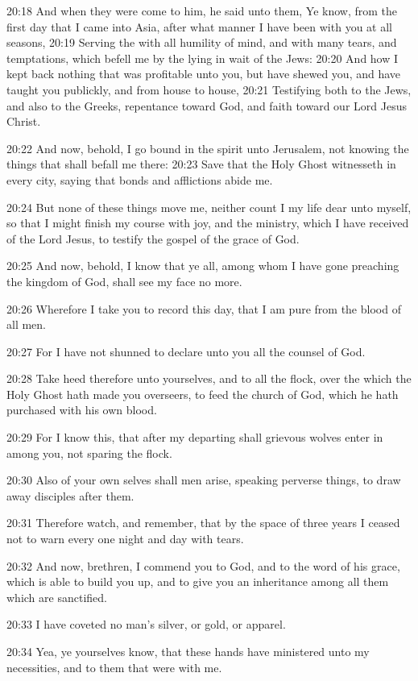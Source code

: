 20:18 And when they were come to him, he said unto them, Ye know, from the first day that I came into Asia, after what manner I have been with you at all seasons, 20:19 Serving the \LORD with all humility of mind, and with many tears, and temptations, which befell me by the lying in wait of the Jews: 20:20 And how I kept back nothing that was profitable unto you, but have shewed you, and have taught you publickly, and from house to house, 20:21 Testifying both to the Jews, and also to the Greeks, repentance toward God, and faith toward our Lord Jesus Christ.

20:22 And now, behold, I go bound in the spirit unto Jerusalem, not knowing the things that shall befall me there: 20:23 Save that the Holy Ghost witnesseth in every city, saying that bonds and afflictions abide me.

20:24 But none of these things move me, neither count I my life dear unto myself, so that I might finish my course with joy, and the ministry, which I have received of the Lord Jesus, to testify the gospel of the grace of God.

20:25 And now, behold, I know that ye all, among whom I have gone preaching the kingdom of God, shall see my face no more.

20:26 Wherefore I take you to record this day, that I am pure from the blood of all men.

20:27 For I have not shunned to declare unto you all the counsel of God.

20:28 Take heed therefore unto yourselves, and to all the flock, over the which the Holy Ghost hath made you overseers, to feed the church of God, which he hath purchased with his own blood.

20:29 For I know this, that after my departing shall grievous wolves enter in among you, not sparing the flock.

20:30 Also of your own selves shall men arise, speaking perverse things, to draw away disciples after them.

20:31 Therefore watch, and remember, that by the space of three years I ceased not to warn every one night and day with tears.

20:32 And now, brethren, I commend you to God, and to the word of his grace, which is able to build you up, and to give you an inheritance among all them which are sanctified.

20:33 I have coveted no man's silver, or gold, or apparel.

20:34 Yea, ye yourselves know, that these hands have ministered unto my necessities, and to them that were with me.

